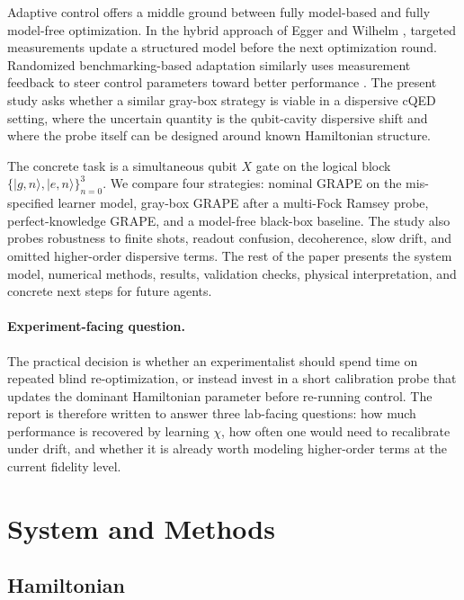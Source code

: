 \documentclass[aps,pra,twocolumn,reprint,amsmath,amssymb]{revtex4-2}
\begin{document}
Adaptive control offers a middle ground between fully model-based and fully model-free
optimization. In the hybrid approach of Egger and Wilhelm \cite{egger2014}, targeted
measurements update a structured model before the next optimization round. Randomized
benchmarking-based adaptation similarly uses measurement feedback to steer control parameters
toward better performance \cite{kelly2014}. The present study asks whether a similar gray-box
strategy is viable in a dispersive cQED setting, where the uncertain quantity is the
qubit-cavity dispersive shift and where the probe itself can be designed around known
Hamiltonian structure.

The concrete task is a simultaneous qubit $X$ gate on the logical block
$\{|g,n\rangle, |e,n\rangle\}_{n=0}^{3}$. We compare four strategies: nominal GRAPE on the
mis-specified learner model, gray-box GRAPE after a multi-Fock Ramsey probe, perfect-knowledge
GRAPE, and a model-free black-box baseline. The study also probes robustness to finite shots,
readout confusion, decoherence, slow drift, and omitted higher-order dispersive terms. The
rest of the paper presents the system model, numerical methods, results, validation checks,
physical interpretation, and concrete next steps for future agents.

\paragraph{Experiment-facing question.}
The practical decision is whether an experimentalist should spend time on repeated blind re-optimization, or instead invest in a short calibration probe that updates the dominant Hamiltonian parameter before re-running control. The report is therefore written to answer three lab-facing questions: how much performance is recovered by learning $\chi$, how often one would need to recalibrate under drift, and whether it is already worth modeling higher-order terms at the current fidelity level.

\section{System and Methods}

\subsection{Hamiltonian}
\end{document}
